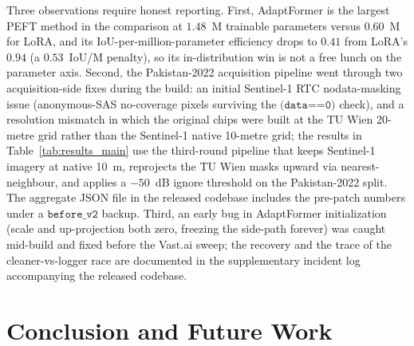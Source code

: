 \documentclass[conference]{IEEEtran}
\begin{document}
Three observations require honest reporting. First, AdaptFormer is the largest PEFT method in the comparison at $1.48$~M trainable parameters versus $0.60$~M for LoRA, and its IoU-per-million-parameter efficiency drops to $0.41$ from LoRA's $0.94$ (a $0.53$~IoU/M penalty), so its in-distribution win is not a free lunch on the parameter axis. Second, the Pakistan-2022 acquisition pipeline went through two acquisition-side fixes during the build: an initial Sentinel-1 RTC nodata-masking issue (anonymous-SAS no-coverage pixels surviving the $\texttt{(data==0)}$ check), and a resolution mismatch in which the original chips were built at the TU Wien 20-metre grid rather than the Sentinel-1 native 10-metre grid; the results in Table~\ref{tab:results_main} use the third-round pipeline that keeps Sentinel-1 imagery at native 10~m, reprojects the TU Wien masks upward via nearest-neighbour, and applies a $-50$~dB ignore threshold on the Pakistan-2022 split. The aggregate JSON file in the released codebase includes the pre-patch numbers under a $\texttt{before\_v2}$ backup. Third, an early bug in AdaptFormer initialization (scale and up-projection both zero, freezing the side-path forever) was caught mid-build and fixed before the Vast.ai sweep; the recovery and the trace of the cleaner-vs-logger race are documented in the supplementary incident log accompanying the released codebase.

\section{Conclusion and Future Work}
\label{sec:conclusion}
\end{document}
